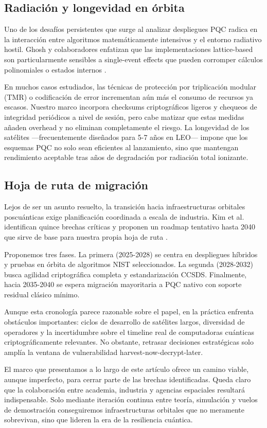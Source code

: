 \subsection{Radiación y longevidad en órbita}

Uno de los desafíos persistentes que surge al analizar despliegues PQC radica en la interacción entre algoritmos matemáticamente intensivos y el entorno radiativo hostil. Ghosh y colaboradores enfatizan que las implementaciones lattice-based son particularmente sensibles a single-event effects que pueden corromper cálculos polinomiales o estados internos \cite{Ghosh2026}.

En muchos casos estudiados, las técnicas de protección por triplicación modular (TMR) o codificación de error incrementan aún más el consumo de recursos ya escasos. Nuestro marco incorpora checksums criptográficos ligeros y chequeos de integridad periódicos a nivel de sesión, pero cabe matizar que estas medidas añaden overhead y no eliminan completamente el riesgo. La longevidad de los satélites —frecuentemente diseñados para 5-7 años en LEO— impone que los esquemas PQC no solo sean eficientes al lanzamiento, sino que mantengan rendimiento aceptable tras años de degradación por radiación total ionizante.

\subsection{Hoja de ruta de migración}

Lejos de ser un asunto resuelto, la transición hacia infraestructuras orbitales poscuánticas exige planificación coordinada a escala de industria. Kim et al. identifican quince brechas críticas y proponen un roadmap tentativo hasta 2040 que sirve de base para nuestra propia hoja de ruta \cite{Kim2026}.

Proponemos tres fases. La primera (2025-2028) se centra en despliegues híbridos y pruebas en órbita de algoritmos NIST seleccionados. La segunda (2028-2032) busca agilidad criptográfica completa y estandarización CCSDS. Finalmente, hacia 2035-2040 se espera migración mayoritaria a PQC nativo con soporte residual clásico mínimo. 

Aunque esta cronología parece razonable sobre el papel, en la práctica enfrenta obstáculos importantes: ciclos de desarrollo de satélites largos, diversidad de operadores y la incertidumbre sobre el timeline real de computadoras cuánticas criptográficamente relevantes. No obstante, retrasar decisiones estratégicas solo amplía la ventana de vulnerabilidad harvest-now-decrypt-later.

El marco que presentamos a lo largo de este artículo ofrece un camino viable, aunque imperfecto, para cerrar parte de las brechas identificadas. Queda claro que la colaboración entre academia, industria y agencias espaciales resultará indispensable. Solo mediante iteración continua entre teoría, simulación y vuelos de demostración conseguiremos infraestructuras orbitales que no meramente sobrevivan, sino que lideren la era de la resiliencia cuántica.